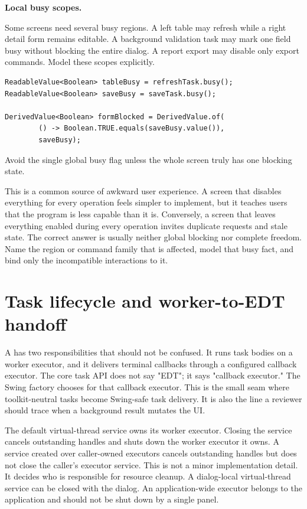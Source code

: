 \textbf{Local busy scopes.}

Some screens need several busy regions. A left table may refresh while a right
detail form remains editable. A background validation task may mark one field
busy without blocking the entire dialog. A report export may disable only export
commands. Model these scopes explicitly.

\begin{lstlisting}[caption={Separate busy facts for separate policies.}]
ReadableValue<Boolean> tableBusy = refreshTask.busy();
ReadableValue<Boolean> saveBusy = saveTask.busy();

DerivedValue<Boolean> formBlocked = DerivedValue.of(
        () -> Boolean.TRUE.equals(saveBusy.value()),
        saveBusy);
\end{lstlisting}

Avoid the single global busy flag unless the whole screen truly has one
blocking state.

This is a common source of awkward user experience. A screen that disables
everything for every operation feels simpler to implement, but it teaches users
that the program is less capable than it is. Conversely, a screen that leaves
everything enabled during every operation invites duplicate requests and stale
state. The correct answer is usually neither global blocking nor complete
freedom. Name the region or command family that is affected, model that busy
fact, and bind only the incompatible interactions to it.

\section{Task lifecycle and worker-to-EDT handoff}

A  has two responsibilities that should not be confused. It
runs task bodies on a worker executor, and it delivers terminal callbacks
through a configured callback executor. The core task API does not say "EDT";
it says "callback executor." The Swing factory chooses 
for that callback executor. This is the small seam where toolkit-neutral tasks
become Swing-safe task delivery. It is also the line a reviewer should trace
when a background result mutates the UI.

The default virtual-thread service owns its worker executor. Closing the
service cancels outstanding handles and shuts down the worker executor it owns.
A service created over caller-owned executors cancels outstanding handles but
does not close the caller's executor service. This is not a minor implementation
detail. It decides who is responsible for resource cleanup. A dialog-local
virtual-thread service can be closed with the dialog. An application-wide
executor belongs to the application and should not be shut down by a single
panel.

